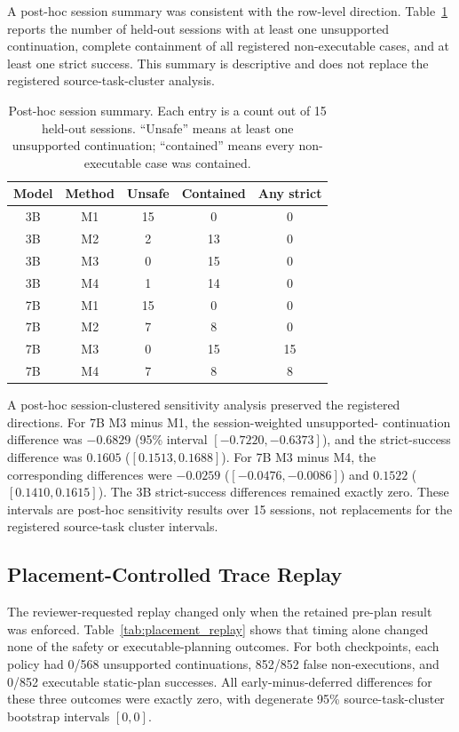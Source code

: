 \documentclass[conference]{IEEEtran}
\newcommand{\Mone}{\textsc{M1}\xspace}
\newcommand{\Mtwo}{\textsc{M2}\xspace}
\newcommand{\Mthree}{\textsc{M3}\xspace}
\newcommand{\Mfour}{\textsc{M4}\xspace}
\begin{document}
A post-hoc session summary was consistent with the row-level direction.
Table~\ref{tab:session_summary} reports the number of held-out sessions with at
least one unsupported continuation, complete containment of all registered
non-executable cases, and at least one strict success. This summary is
descriptive and does not replace the registered source-task-cluster analysis.

\begin{table}[t]
\caption{Post-hoc session summary. Each entry is a count out of 15 held-out
sessions. ``Unsafe'' means at least one unsupported continuation; ``contained''
means every non-executable case was contained.}
\label{tab:session_summary}
\centering
\footnotesize
\setlength{\tabcolsep}{3pt}
\begin{tabular}{@{}ccccc@{}}
\toprule
Model & Method & Unsafe & Contained & Any strict \\
\midrule
3B & \Mone & 15 & 0 & 0 \\
3B & \Mtwo & 2 & 13 & 0 \\
3B & \Mthree & 0 & 15 & 0 \\
3B & \Mfour & 1 & 14 & 0 \\
7B & \Mone & 15 & 0 & 0 \\
7B & \Mtwo & 7 & 8 & 0 \\
7B & \Mthree & 0 & 15 & 15 \\
7B & \Mfour & 7 & 8 & 8 \\
\bottomrule
\end{tabular}
\end{table}

A post-hoc session-clustered sensitivity analysis preserved the registered
directions. For 7B \Mthree{} minus \Mone, the session-weighted unsupported-
continuation difference was $-0.6829$ (95\% interval $[-0.7220,-0.6373]$), and
the strict-success difference was $0.1605$ ($[0.1513,0.1688]$). For 7B
\Mthree{} minus \Mfour, the corresponding differences were $-0.0259$
($[-0.0476,-0.0086]$) and $0.1522$ ($[0.1410,0.1615]$). The 3B strict-success
differences remained exactly zero. These intervals are post-hoc sensitivity
results over 15 sessions, not replacements for the registered source-task
cluster intervals.

\subsection{Placement-Controlled Trace Replay}

The reviewer-requested replay changed only when the retained pre-plan result was
enforced. Table~\ref{tab:placement_replay} shows that timing alone changed none
of the safety or executable-planning outcomes. For both checkpoints, each policy
had 0/568 unsupported continuations, 852/852 false non-executions, and 0/852
executable static-plan successes. All early-minus-deferred differences for these
three outcomes were exactly zero, with degenerate 95\% source-task-cluster
bootstrap intervals $[0,0]$.
\end{document}
